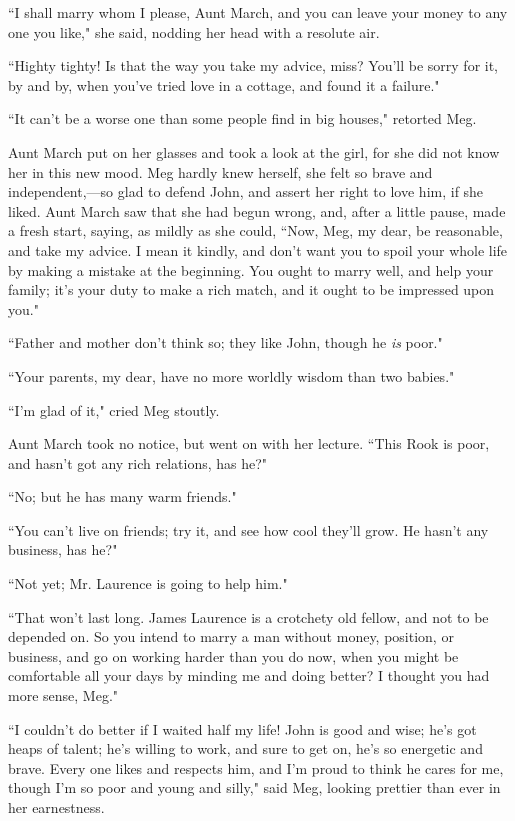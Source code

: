 ``I shall marry whom I please, Aunt March, and you can leave your money
to any one you like," she said, nodding her head with a resolute air.

``Highty tighty! Is that the way you take my advice, miss?
You'll be sorry for it, by and by, when
you've tried love in a cottage, and found it a failure."

``It can't be a worse one than some people find in big
houses," retorted Meg.

Aunt March put on her glasses and took a look at the girl, for she did
not know her in this new mood. Meg hardly knew herself, she felt so
brave and independent,---so glad to defend John, and assert her right to
love him, if she liked. Aunt March saw that she had begun wrong, and,
after a little pause, made a fresh start, saying, as mildly as she
could, ``Now, Meg, my dear, be reasonable, and take my advice. I mean it
kindly, and don't want you to spoil your whole life by
making a mistake at the beginning. You ought to marry well, and help
your family; it's your duty to make a rich match, and it
ought to be impressed upon you."

``Father and mother don't think so; they like John,
though he \emph{is} poor."

``Your parents, my dear, have no more worldly wisdom than two babies."

``I'm glad of it," cried Meg stoutly.

Aunt March took no notice, but went on with her lecture. ``This Rook is
poor, and hasn't got any rich relations, has he?"

``No; but he has many warm friends."

``You can't live on friends; try it, and see how cool
they'll grow. He hasn't any business,
has he?"

``Not yet; Mr. Laurence is going to help him."

``That won't last long. James Laurence is a crotchety old
fellow, and not to be depended on. So you intend to marry a man without
money, position, or business, and go on working harder than you do now,
when you might be comfortable all your days by minding me and doing
better? I thought you had more sense, Meg."

``I couldn't do better if I waited half my life! John is
good and wise; he's got heaps of talent;
he's willing to work, and sure to get on,
he's so energetic and brave. Every one likes and
respects him, and I'm proud to think he cares for me,
though I'm so poor and young and silly," said Meg,
looking prettier than ever in her earnestness.

